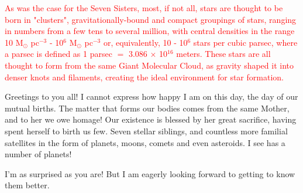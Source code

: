 \documentclass[main.tex]{subfiles}
\begin{document}
\begin{tcolorbox}[sharp corners, colback=red!30, colframe=red!80!blue, title=Satellites]
\par \textcolor{red} {As was the case for the Seven Sisters, most, if not all, stars are thought to be born in "clusters", gravitationally-bound and compact groupings of stars, ranging in numbers from a few tens to several million, with central densities in the range 10 M$_{\odot}$ pc$^{-3}$ - 10$^6$ M$_{\odot}$ pc$^{-3}$ or, equivalently, 10 - 10$^6$ stars per cubic parsec, where a parsec is defined as 1 parsec $=$ 3.086 $\times$ 10$^{16}$ meters.  These stars are all thought to form from the same Giant Molecular Cloud, as gravity shaped it into denser knots and filaments, creating the ideal environment for star formation.}  
\end{tcolorbox} 

\par \Maia Greetings to you all!  I cannot express how happy I am on this day, the day of our mutual births.  The matter that forms our bodies comes from the same Mother, and to her we owe homage!  Our existence is blessed by her great sacrifice, having spent herself to birth us few.  Seven stellar siblings, and countless more familial satellites in the form of planets, moons, comets and even asteroids.  I see \rmelectra has a number of planets!

\par \Electra I'm as surprised as you are!  But I am eagerly looking forward to getting to know them better.
\end{document}
